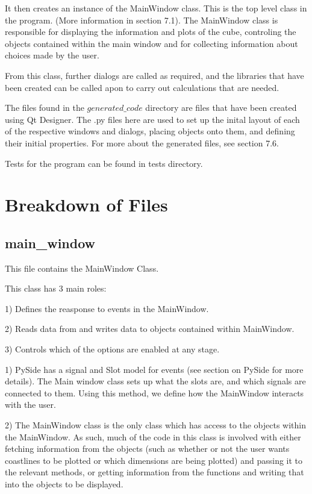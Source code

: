 \documentclass[whitecover]{MO_report}
\begin{document}
It then creates an instance of the MainWindow class. This is the top level
class in the program. (More information in section 7.1). The MainWindow
class is responsible for displaying the information and plots of the cube,
controling the objects contained within the main window and for collecting
information about choices made by the user. 

From this class, further dialogs are called as required, and the libraries that
have been created can be called apon to carry out calculations that are needed.

The files found in the $generated\_code$ directory are files that have been
created using Qt Designer. The .py files here are used to set up the inital
layout of each of the respective windows and dialogs, placing objects onto them,
and defining their initial properties. For more about the generated files, see
section 7.6.

Tests for the program can be found in tests directory.


\pagebreak


\chapter{Breakdown of Files}

\section{main\_window}

This file contains the MainWindow Class.

This class has 3 main roles:

1) Defines the reasponse to events in the MainWindow.

2) Reads data from and writes data to objects contained within MainWindow.

3) Controls which of the options are enabled at any stage.

\vspace{4mm}

1) PySide has a signal and Slot model for events (see section on PySide for
more details). The Main window class sets up what the slots are, and which
signals are connected to them. Using this method, we define how the MainWindow
interacts with the user. 

2) The MainWindow class is the only class which has access to the objects
within the MainWindow. As such, much of the code in this class is
involved with either fetching information from the objects (such as whether or
not the user wants coastlines to be plotted or which dimensions are being
plotted) and passing it to the relevant methods, or getting information from
the functions and writing that into the objects to be displayed.
\end{document}
